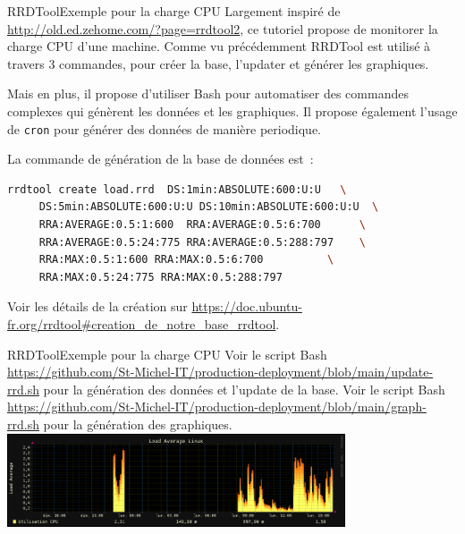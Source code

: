 \documentclass{beamer}
\begin{document}
    \begin{frame}[fragile]{RRDTool}{Exemple pour la charge CPU}
        Largement inspiré de \url{http://old.ed.zehome.com/?page=rrdtool2}, ce tutoriel propose de monitorer la charge CPU d'une machine.
        \bigbreak
        Comme vu précédemment RRDTool est utilisé à travers 3 commandes, pour créer la base, l'updater et générer les graphiques.

        Mais en plus, il propose d'utiliser Bash pour automatiser des commandes complexes qui génèrent les données et les graphiques.
        Il propose également l'usage de \lstinline{cron} pour générer des données de manière periodique.

        La commande de génération de la base de données est~:
        \begin{lstlisting}[language=bash,basicstyle=\ttfamily\tiny]
rrdtool create load.rrd  DS:1min:ABSOLUTE:600:U:U   \
     DS:5min:ABSOLUTE:600:U:U DS:10min:ABSOLUTE:600:U:U  \
     RRA:AVERAGE:0.5:1:600  RRA:AVERAGE:0.5:6:700      \
     RRA:AVERAGE:0.5:24:775 RRA:AVERAGE:0.5:288:797    \
     RRA:MAX:0.5:1:600 RRA:MAX:0.5:6:700          \
     RRA:MAX:0.5:24:775 RRA:MAX:0.5:288:797
        \end{lstlisting}
        Voir les détails de la création sur \url{https://doc.ubuntu-fr.org/rrdtool#creation_de_notre_base_rrdtool}.
    \end{frame}

    \begin{frame}{RRDTool}{Exemple pour la charge CPU}
        Voir le script Bash \url{https://github.com/St-Michel-IT/production-deployment/blob/main/update-rrd.sh} pour la génération des données et l'update de la base.
        \bigbreak
        Voir le script Bash \url{https://github.com/St-Michel-IT/production-deployment/blob/main/graph-rrd.sh} pour la génération des graphiques.
        \bigbreak
        \centering
        \includegraphics[width=10cm]{image/../../load.equinoxe-day}
    \end{frame}
\end{document}
